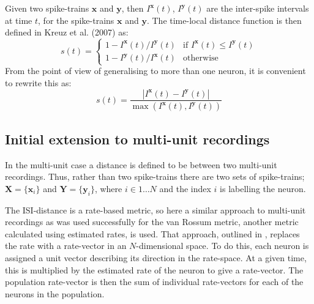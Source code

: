 Given two spike-trains $\mathbf{x}$ and $\mathbf{y}$, then $I^{\mathbf{x}}(t)$, $I^{\mathbf{y}}(t)$ are the inter-spike intervals at time $t$, for the spike-trains $\mathbf{x}$ and $\mathbf{y}$.  The time-local distance function is then defined in Kreuz et al. (2007) as:
\begin{equation}
s(t) = \left\{ \begin{array}{ll} 1-I^{\mathbf{x}}(t) / I^{\mathbf{y}}(t)  & \text{if } I^{\mathbf{x}}(t) \leq I^{\mathbf{y}}(t) \\ 1- I^{\mathbf{y}}(t) / I^{\mathbf{x}}(t)  & \text{otherwise} \end{array} \right.
\end{equation}
From the point of view of generalising to more than one neuron, it is convenient to rewrite this as:
\begin{equation}
s(t) = \frac{ | I^{\mathbf{x}}(t) - I^{\mathbf{y}}(t) | }{\max (I^{\mathbf{x}}(t), I^{\mathbf{y}}(t)) }
\end{equation}

\subsection{Initial extension to multi-unit recordings}

In the multi-unit case a distance is defined to be between two multi-unit recordings.  Thus, rather than two spike-trains there are two sets of spike-trains; $\mathbf{X}=\{ \mathbf{x}_i \}$ and $ \mathbf{Y}=\{ \mathbf{y}_i \}$, where $i \in 1\ldots N$ and the index $i$ is labelling the neuron.

The ISI-distance is a rate-based metric, so here a similar approach to multi-unit recordings as was used successfully for the van Rossum metric, another metric calculated using estimated rates, is used.  That approach, outlined in \citep{HoughtonSen2008}, replaces the rate with a rate-vector in an $N$-dimensional space.  To do this, each neuron is assigned a unit vector describing its direction in the rate-space.  At a given time, this is multiplied by the estimated rate of the neuron to give a rate-vector. The population rate-vector is then the sum of individual rate-vectors for each of the neurons in the population.  

